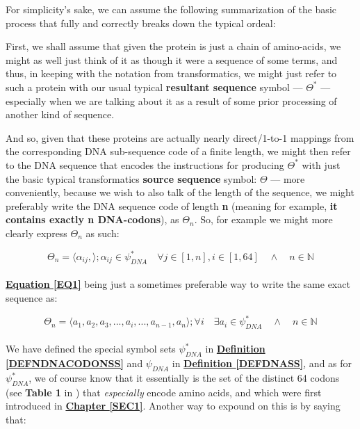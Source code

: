 \documentclass[a4paper, 18pt]{book} %
\begin{document}
For simplicity's sake, we can assume the following summarization of the basic process that fully and correctly breaks down the typical ordeal:

First, we shall assume that given the protein is just a chain of amino-acids, we might as well just think of it as though it were a sequence of some terms, and thus, in keeping with the notation from transformatics, we might just refer to such a protein with our usual typical \textbf{resultant sequence} symbol --- $\Theta^*$ --- especially when we are talking about it as a result of some prior processing of another kind of sequence.

And so, given that these proteins are actually nearly direct/1-to-1 mappings from the corresponding DNA sub-sequence code of a finite length, we might then refer to the DNA sequence that encodes the instructions for producing $\Theta^*$ with just the basic typical transformatics \textbf{source sequence} symbol: $\Theta$ --- more conveniently, because we wish to also talk of the length of the sequence, we might preferably write the DNA sequence code of length \textbf{n} (meaning for example, \textbf{it contains exactly n DNA-codons}), as $\Theta_n$. So, for example we might more clearly express $\Theta_n$ as such:

\begin{equation}
\label{EQ1}
\Theta_n = \langle \alpha_{ij}, \rangle ;
\alpha_{ij} \in \psi_{DNA}^* \quad \forall j \in [1,n],  i \in [1,64] \quad \land \quad n \in \mathbb{N}
\end{equation}\\

\textbf{\hyperref[EQ1]{Equation \ref{EQ1}}} being just a sometimes preferable way to write the same exact sequence as:
 
 
 \begin{equation}
\label{EQ2}
\Theta_n = \langle a_1,a_2,a_3,...,a_i,...,a_{n-1},a_n \rangle ;
\forall i \quad \exists a_i \in \psi_{DNA}^* \quad \land \quad n \in \mathbb{N}
\end{equation}\\

We have defined the special symbol sets $\psi_{DNA}^*$ in \textbf{\hyperref[DEFNDNACODONSS]{Definition \ref{DEFNDNACODONSS}}} and  $\psi_{DNA}$ in \textbf{\hyperref[DEFDNASS]{Definition \ref{DEFDNASS}}}, and as for $\psi_{DNA}^*$, we of course know that it essentially is the set of the distinct 64 codons (see \textbf{Table 1} in \cite{gregory1987oxford}) that \textit{especially} encode amino acids, and which were first introduced in \textbf{\hyperref[SEC1]{Chapter \ref{SEC1}}}. Another way to expound on this is by saying that:
\end{document}
